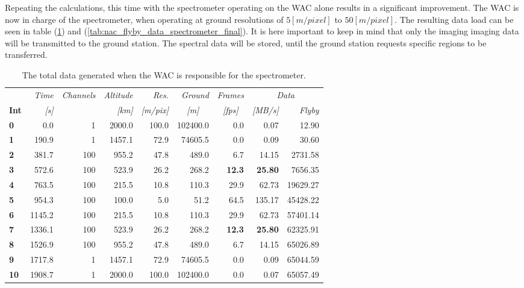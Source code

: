 Repeating the calculations, this time with the spectrometer operating on the WAC alone results in a significant improvement. The WAC is now in charge of the spectrometer, when operating at ground resolutions of $5[m/pixel]$ to $50[m/pixel]$. The resulting data load can be seen in table (\ref{tab:wac_flyby_data_spectrometer_final}) and (\ref{tab:nac_flyby_data_spectrometer_final}). It is here important to keep in mind that only the imaging imaging data will be transmitted to the ground station. The spectral data will be stored, until the ground station requests specific regions to be transferred.
\begin{table}[h!]
  \centering
    \begin{tabular}{l|r|r|r|r|r|r|r|r}
      & \textit{Time} & \textit{Channels} & \textit{Altitude} & \textit{Res.} & \textit{Ground} & \textit{Frames } & \multicolumn{2}{c}{\textit{Data}} \\
\textbf{Int} & \textit{[s]} & \textit{} & \textit{[km]} & \textit{[m/pix]} & \multicolumn{1}{c|}{\textit{[m]}} & \multicolumn{1}{c|}{\textit{[fps]}} & \textit{[MB/s]} & \textit{Flyby} \bigstrut[b]\\
\hline
\textbf{0} & 0.0   & 1     & 2000.0 & 100.0 & 102400.0 & 0.0   & 0.07  & 12.90 \bigstrut[t]\\
\textbf{1} & 190.9 & 1     & 1457.1 & 72.9  & 74605.5 & 0.0   & 0.09  & 30.60 \\
\textbf{2} & 381.7 & 100   & 955.2 & 47.8  & 489.0 & 6.7   & 14.15 & 2731.58 \\
\textbf{3} & 572.6 & 100   & 523.9 & 26.2  & 268.2 & \textbf{12.3} & \textbf{25.80} & 7656.35 \\
\textbf{4} & 763.5 & 100   & 215.5 & 10.8  & 110.3 & 29.9  & 62.73 & 19629.27 \\
\textbf{5} & 954.3 & 100   & 100.0 & 5.0   & 51.2  & 64.5  & 135.17 & 45428.22 \\
\textbf{6} & 1145.2 & 100   & 215.5 & 10.8  & 110.3 & 29.9  & 62.73 & 57401.14 \\
\textbf{7} & 1336.1 & 100   & 523.9 & 26.2  & 268.2 & \textbf{12.3} & \textbf{25.80} & 62325.91 \\
\textbf{8} & 1526.9 & 100   & 955.2 & 47.8  & 489.0 & 6.7   & 14.15 & 65026.89 \\
\textbf{9} & 1717.8 & 1     & 1457.1 & 72.9  & 74605.5 & 0.0   & 0.09  & 65044.59 \\
\textbf{10} & 1908.7 & 1     & 2000.0 & 100.0 & 102400.0 & 0.0   & 0.07  & 65057.49 \\
\end{tabular}%
  \caption{The total data generated when the WAC is responsible for the spectrometer.}
  \label{tab:wac_flyby_data_spectrometer_final}%
\end{table}%

